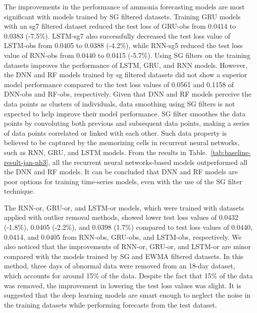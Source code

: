 The improvements in the performance of ammonia forecasting models are most significant with models trained by SG filtered datasets. Training GRU models with an sg7 filtered dataset reduced the test loss of GRU-obs from 0.0414 to 0.0383 (-7.5\%). LSTM-sg7 also successfully decreased the test loss value of LSTM-obs from 0.0405 to 0.0388 (-4.2\%), while RNN-sg5 reduced the test loss value of RNN-obs from 0.0440 to 0.0415 (-5.7\%). Using SG filters on the training datasets improves the performance of LSTM, GRU, and RNN models. However, the DNN and RF models trained by sg filtered datasets did not show a superior model performance compared to the test loss values of 0.0561 and 0.1158 of DNN-obs and RF-obs, respectively. Given that DNN and RF models perceive the data points as clusters of individuals, data smoothing using SG filters is not expected to help improve their model performance. SG filter smoothes the data points by convoluting both previous and subsequent data points, making a series of data points correlated or linked with each other. Such data property is believed to be captured by the memorizing cells in recurrent neural networks, such as RNN, GRU, and LSTM models. From the results in Table.~\ref{tab:baseline-result-jan-nh3}, all the recurrent neural networks-based models outperformed all the DNN and RF models. It can be concluded that DNN and RF models are poor options for training time-series models, even with the use of the SG filter technique.

The RNN-or, GRU-or, and LSTM-or models, which were trained with datasets applied with outlier removal methods, showed lower test loss values of 0.0432 (-1.8\%), 0.0405 (-2.2\%), and 0.0398 (1.7\%) compared to test loss values of 0.0440, 0.0414, and 0.0405 from RNN-obs, GRU-obs, and LSTM-obs, respectively. We also noticed that the improvements of RNN-or, GRU-or, and LSTM-or are minor compared with the models trained by SG and EWMA filtered datasets. In this method, three days of abnormal data were removed from an 18-day dataset, which accounts for around 15\% of the data. Despite the fact that 15\% of the data was removed, the improvement in lowering the test loss values was slight. It is suggested that the deep learning models are smart enough to neglect the noise in the training datasets while performing forecasts from the test dataset.

